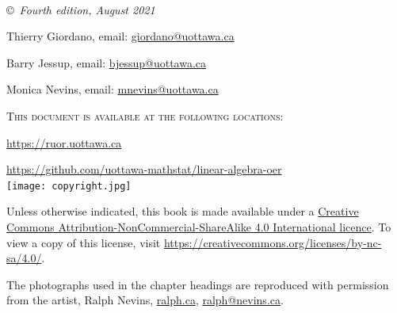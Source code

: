 \documentclass[11pt]{book} %
\begin{document}

\newpage
~\vfill
\thispagestyle{empty}





\noindent \copyright\ \textit{Fourth edition, August 2021} %



\smallskip
\noindent Thierry Giordano, email:
\href{mailto:giordano@uottawa.ca}{giordano@uottawa.ca}



\smallskip
\noindent Barry Jessup, email:
\href{mailto:bjessup@uottawa.ca}{bjessup@uottawa.ca}


\smallskip

\noindent Monica Nevins, email:
\href{mailto:mnevins@uottawa.ca}{mnevins@uottawa.ca}

\smallskip

\noindent \textsc{This document is available at the following locations:} 

\href{https://ruor.uottawa.ca/handle/10393/43430}{https://ruor.uottawa.ca} 

\href{https://github.com/uottawa-mathstat/linear-algebra-oer}{https://github.com/uottawa-mathstat/linear-algebra-oer}  \\%



\noindent \texttt{[image: copyright.jpg]}

\noindent Unless otherwise indicated, this book is made available under a \href{https://creativecommons.org/licenses/by-nc-sa/4.0/}{Creative Commons Attribution-NonCommercial-ShareAlike 4.0 International licence}.  To view a copy of this license, visit \url{https://creativecommons.org/licenses/by-nc-sa/4.0/}.

\noindent The photographs used in the chapter headings are reproduced with permission from the artist, Ralph Nevins, \url{ralph.ca}, \href{mailto:ralph@nevins.ca}{ralph@nevins.ca}.

\vspace{1in}

\end{document}
